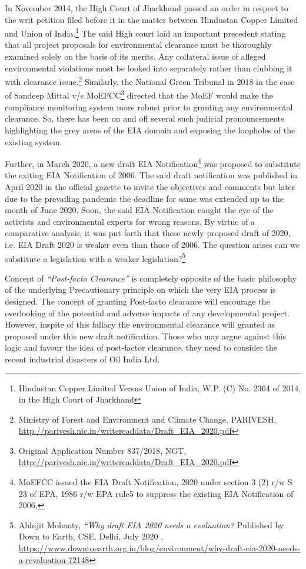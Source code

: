 \begin{multicols}{2}

In November 2014, the High Court of Jharkhand passed an order in respect to the writ
petition filed before it in the matter between Hindustan Copper Limited and Union of India.\footnote{Hindustan Copper Limited Versus Union of India, W.P. (C) No. 2364 of 2014, in the High Court of
Jharkhand}
The said High court laid an important precedent stating that all project proposals for
environmental clearance must be thoroughly examined solely on the basis of its merits. Any
collateral issue of alleged environmental violations must be looked into separately rather than
clubbing it with clearance issue.\footnote{Ministry of Forest and Environment and Climate Change, PARIVESH,
\url{http://parivesh.nic.in/writereaddata/Draft_EIA_2020.pdf}} Similarly, the National Green Tribunal in 2018 in the case
of Sandeep Mittal v/s MoEFCC\footnote{Original Application Number 837/2018, NGT, \url{http://parivesh.nic.in/writereaddata/Draft_EIA_2020.pdf}} directed that the MoEF would make the compliance
monitoring system more robust prior to granting any environmental clearance. So, there has
been on and off several such judicial pronouncements highlighting the grey areas of the EIA
domain and exposing the loopholes of the existing system.

\noi
Further, in March 2020, a new draft EIA Notification\footnote{MoEFCC issued the EIA Draft Notification, 2020 under section 3 (2) r/w S 23 of EPA, 1986 r/w EPA rule5 to
suppress the existing EIA Notification of 2006.} was proposed to substitute the exiting
EIA Notification of 2006. The said draft notification was published in April 2020 in the
official gazette to invite the objectives and comments but later due to the prevailing pandemic
the deadline for same was extended up to the month of June 2020. Soon, the said EIA
Notification caught the eye of the activists and environmental experts for wrong reasons. By
virtue of a comparative analysis, it was put forth that these newly proposed draft of 2020, i.e.
EIA Draft 2020 is weaker even than those of 2006. The question arises can we substitute a
legislation with a weaker legislation?\footnote{Abhijit Mohanty, \textit{“Why draft EIA 2020 needs a evaluation?} Published by Down to Earth, CSE, Delhi, July
2020 , \url{https://www.downtoearth.org.in/blog/environment/why-draft-eia-2020-needs-a-revaluation-72148}}

\noi
Concept of \textit{“Post-facto Clearance”} is completely opposite of the basic philosophy of the
underlying Precautionary principle on which the very EIA process is designed. The concept
of granting Post-facto clearance will encourage the overlooking of the potential and adverse impacts of any developmental project. However, inspite of this fallacy the environmental
clearance will granted as proposed under this new draft notification. Those who may argue
against this logic and favour the idea of post-factor clearance, they need to consider the recent
industrial disasters of Oil India Ltd.


\end{multicols}

